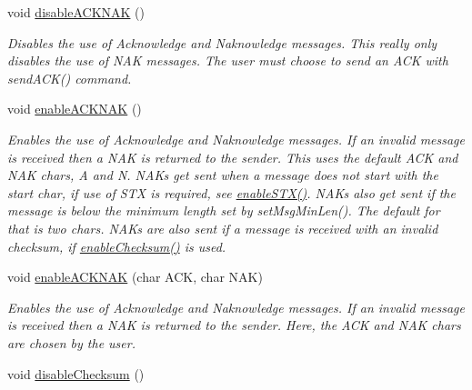 \begin{DoxyCompactItemize}
\mbox{\label{class_serial_checker_a295355c5872140d105d0eb0178c4a00d}} 
void \mbox{\hyperlink{class_serial_checker_a295355c5872140d105d0eb0178c4a00d}{disable\+A\+C\+K\+N\+AK}} ()
\begin{DoxyCompactList}\small\item\em Disables the use of Acknowledge and Naknowledge messages. This really only disables the use of N\+AK messages. The user must choose to send an A\+CK with send\+A\+C\+K() command. \end{DoxyCompactList}\item 
\mbox{\label{class_serial_checker_a72ba80ea1aba41a503d0907d45049533}} 
void \mbox{\hyperlink{class_serial_checker_a72ba80ea1aba41a503d0907d45049533}{enable\+A\+C\+K\+N\+AK}} ()
\begin{DoxyCompactList}\small\item\em Enables the use of Acknowledge and Naknowledge messages. If an invalid message is received then a N\+AK is returned to the sender. This uses the default A\+CK and N\+AK chars, \textquotesingle{}A\textquotesingle{} and \textquotesingle{}N\textquotesingle{}. N\+A\+Ks get sent when a message does not start with the start char, if use of S\+TX is required, see \mbox{\hyperlink{class_serial_checker_a0292d1718016ff5377c9c5bd56f80149}{enable\+S\+T\+X()}}. N\+A\+Ks also get sent if the message is below the minimum length set by set\+Msg\+Min\+Len(). The default for that is two chars. N\+A\+Ks are also sent if a message is received with an invalid checksum, if \mbox{\hyperlink{class_serial_checker_ae1b4a8c6e776c5915714c3ed152633cc}{enable\+Checksum()}} is used. \end{DoxyCompactList}\item 
void \mbox{\hyperlink{class_serial_checker_ac8f49684c75e2b88a72535570d2d35ad}{enable\+A\+C\+K\+N\+AK}} (char A\+CK, char N\+AK)
\begin{DoxyCompactList}\small\item\em Enables the use of Acknowledge and Naknowledge messages. If an invalid message is received then a N\+AK is returned to the sender. Here, the A\+CK and N\+AK chars are chosen by the user. \end{DoxyCompactList}\item 
\mbox{\label{class_serial_checker_a84fc2fd193cb378d83641a0ef46e8daa}} 
void \mbox{\hyperlink{class_serial_checker_a84fc2fd193cb378d83641a0ef46e8daa}{disable\+Checksum}} ()

\end{DoxyCompactItemize}
